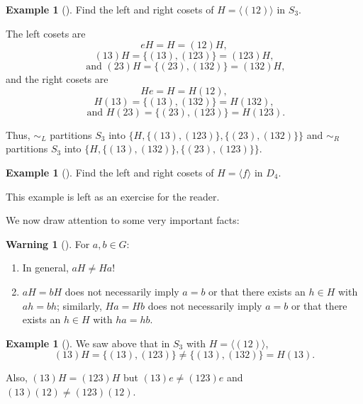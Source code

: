 \documentclass[10pt,]{book}
\theoremstyle{plain}
\theoremstyle{definition}
\theoremstyle{definition}
\newtheorem{warning}[theorem]{Warning}
\theoremstyle{definition}
\newtheorem{example}[theorem]{Example}
\theoremstyle{definition}
\numberwithin{equation}{section}
\def\siml{\sim_L}
\def\simr{\sim_R}
\begin{document}
\begin{example}[]\label{s3_ex}
Find the left and right cosets of \(H=\langle (12)\rangle\) in \(S_3\).%
\par
The left cosets are%
\begin{equation*}
eH=H=(12)H,
\end{equation*}
%
\begin{equation*}
(13)H=\{(13),(123)\}=(123)H,
\end{equation*}
%
\begin{equation*}
\text{ and } (23)H=\{(23),(132)\}=(132)H,
\end{equation*}
and the right cosets are%
\begin{equation*}
He=H=H(12),
\end{equation*}
%
\begin{equation*}
H(13)=\{(13),(132)\}=H(132),
\end{equation*}
%
\begin{equation*}
\text{ and } H(23)=\{(23),(123)\}=H(123).
\end{equation*}
%
\par
Thus, \(\siml\) partitions \(S_3\) into \(\{H,\{(13),(123)\},\{(23),
(132)\}\}\) and \(\simr\) partitions \(S_3\) into \(\{H,\{(13),(132)\},\{(23), (123)\}\}\).%
\end{example}
\begin{example}[]\label{d4_ex}
Find the left and right cosets of \(H=\langle f\rangle\) in \(D_4\).%
\par
This example is left as an exercise for the reader.%
\end{example}
We now draw attention to some very important facts:%
\begin{warning}[]\label{warning-23}
For \(a,b\in G\): \leavevmode%
\begin{enumerate}
\item\hypertarget{li-404}{}In general, \(aH \neq Ha\)!%
\item\hypertarget{li-405}{}\(aH=bH\) does not necessarily imply \(a=b\) or that there exists an \(h\in H\) with \(ah=bh\); similarly, \(Ha=Hb\) does not necessarily imply \(a=b\) or that there exists an \(h\in H\) with \(ha=hb\).%
\end{enumerate}
%
\end{warning}
\begin{example}[]\label{example-70}
We saw above that in \(S_3\) with \(H=\langle (12)\rangle\),%
\begin{equation*}
(13)H=\{(13),(123)\} \neq \{(13),(132)\}=H(13).
\end{equation*}
%
\par
Also, \((13)H=(123)H\) but \((13)e\neq (123)e\) and \((13)(12)\neq (123)(12)\).%
\end{example}
\end{document}
